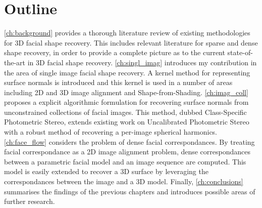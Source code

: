 \section{Outline}\label{sec:introduction_outline}
\cref{ch:background} provides a thorough literature review of existing
methodologies for 3D facial shape recovery. This includes relevant literature
for sparse and dense shape recovery, in order to provide a complete
picture as to the current state-of-the-art in 3D facial shape recovery.
\cref{ch:singl_imag} introduces my contribution in the area of single image
facial shape recovery. A kernel method for representing surface normals is 
introduced and this kernel is used in a number of areas including 2D and 3D
image alignment and Shape-from-Shading.
\cref{ch:imag_coll} proposes a explicit algorithmic formulation for recovering
surface normals from unconstrained collections of facial images. This method,
dubbed Class-Specific Photometric Stereo, extends existing work on Uncalibrated
Photometric Stereo~\cite{KemelmacherShlizerman:2013iv,basri2007photometric}
with a robust method of recovering a per-image spherical harmonics.
\cref{ch:face_flow} considers the problem of dense facial correspondances. By
treating facial correspondance as a 2D image alignment problem, dense
correspondances between a parametric facial model and an image sequence are
computed. This model is easily extended to recover a 3D surface by leveraging
the correspondances between the image and a 3D model. 
Finally, \cref{ch:conclusions} summarises the findings of the previous chapters
and introduces possible areas of further research. 
